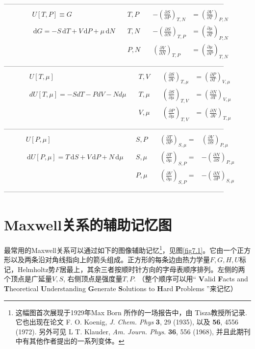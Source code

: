 ————————————————————————————————
\begin{align}
	& U[T, P] \equiv G \quad & T, P \quad & -\left( \frac{\partial S}{\partial P} \right)_{T, N} &= \left( \frac{\partial V}{\partial T} \right)_{P, N} \label{equ7.15} \\
	& \,\mathrm dG = -S\,\mathrm dT + V\,\mathrm dP + \mu \,\mathrm dN \quad & T, N \quad & -\left( \frac{\partial S}{\partial N} \right)_{T, P} &= \left( \frac{\partial \mu}{\partial T} \right)_{P, N} \label{equ7.16} \\
	& \phantom{dG = -SdT + VdP + \mu dN \quad} & P, N \quad & \left( \frac{\partial V}{\partial N} \right)_{T, P} &= \left( \frac{\partial \mu}{\partial P} \right)_{T, N} \label{equ7.17}
\end{align}
————————————————————————————————
\begin{align}
	& U[T, \mu] \quad & T, V \quad & \left( \frac{\partial S}{\partial V} \right)_{T, \mu} &= \left( \frac{\partial P}{\partial T} \right)_{V, \mu} \label{equ7.18} \\
	& dU[T, \mu] = -SdT - PdV - Nd\mu \quad & T, \mu \quad & \left( \frac{\partial S}{\partial \mu} \right)_{T, V} &= \left( \frac{\partial N}{\partial T} \right)_{V, \mu} \label{equ7.19} \\
	& \phantom{dU[T, \mu] = -SdT - PdV - Nd\mu \quad} & V, \mu \quad & \left( \frac{\partial P}{\partial \mu} \right)_{T, V} &= \left( \frac{\partial N}{\partial V} \right)_{T, \mu} \label{equ7.20}
\end{align}
————————————————————————————————
\begin{align}
	& U[P, \mu] \quad & S, P \quad & \left( \frac{\partial T}{\partial P} \right)_{S, \mu} =& \left( \frac{\partial V}{\partial S} \right)_{P, \mu} \label{equ7.21} \\
	& \,\mathrm dU[P, \mu] = T\,\mathrm dS + V\,\mathrm dP + N\,\mathrm d\mu \quad & S, \mu \quad & \left( \frac{\partial T}{\partial \mu} \right)_{S, P} =& -\left( \frac{\partial N}{\partial S} \right)_{P, \mu} \label{equ7.22} \\
	& \phantom{ dU[P, \mu] = TdS + VdP + Nd\mu \quad} & P, \mu \quad & \left( \frac{\partial V}{\partial \mu} \right)_{S, P} =& -\left( \frac{\partial N}{\partial P} \right)_{S, \mu} \label{equ7.23}
\end{align}
————————————————————————————————

\section{Maxwell关系的辅助记忆图}
\label{sec7.2}
最常用的Maxwell关系可以通过如下的图像辅助记忆\footnote{这幅图首次展现于1929年Max Born 所作的一场报告中，由 Tisza教授所记录. 它也出现在论文 F. O. Koenig, {\it J. Chem. Phys} {\bf 3}, 29 (1935),  以及 {\bf 56}, 4556 (1972). 另外可见 L T. Klauder,  {\it Am. Journ. Phys}. {\bf 36}, 556 (1968), 并且此期刊中有其他作者提出的一系列变体。}，见图\ref{fig7.1}。它由一个正方形以及两条沿对角线指向上的箭头组成。正方形的每条边由热力学量$F, G, H, U$标记，Helmholtz势$F$居最上，其余三者按顺时针方向的字母表顺序排列。左侧的两个顶点是广延量$V, S$, 右侧顶点是强度量$T, P$. （整个顺序可以用`` {\bf V}alid {\bf F}acts and {\bf T}heoretical {\bf U}nderstanding {\bf G}enerate {\bf S}olutions to {\bf H}ard {\bf P}roblems ''来记忆）

